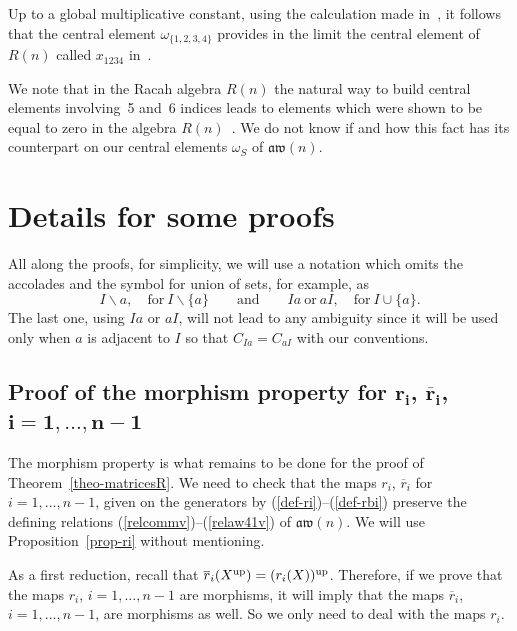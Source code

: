 \documentclass[10pt,a4paper]{amsart}
\numberwithin{equation}{section}
\theoremstyle{definition}
\newcommand{\rb}{\overline{r}}
\newcommand{\aw}{\mathfrak{aw}(n)}
\begin{document}
 Up to a global multiplicative constant, using the calculation made in~\cite{CFR}, it follows that the central element $\omega_{\{1,2,3,4\}}$ provides in the limit the central element of $R(n)$ called $x_{1234}$ in~\cite{CFR, CGPV}.

 We note that in the Racah algebra $R(n)$ the natural way to build central elements involving~5 and~6 indices leads to elements which were shown to be equal to zero in the algebra $R(n)$~\cite{CGPV}. We do not know if and how this fact has its counterpart on our central elements $\omega_S$ of $\aw$.

\appendix

\section{Details for some proofs}\label{sec-appendix}

All along the proofs, for simplicity, we will use a notation which omits the accolades and the symbol for union of sets, for example, as
\[I\backslash a, \quad \text{for}\ I\backslash\{a\}\qquad \text{and}\qquad Ia\ \text{or}\ aI, \quad \text{for}\ I\cup\{a\} .\]
The last one, using $Ia$ or $aI$, will not lead to any ambiguity since it will be used only when $a$ is adjacent to $I$ so that $C_{Ia}=C_{aI}$ with our conventions.

\subsection[Proof of the morphism property for r\_i, bar r\_i, i=1,...,n-1]{Proof of the morphism property for $\boldsymbol{r_i}$, $\boldsymbol{\rb_i}$, $\boldsymbol{i=1,\ldots,n-1}$}
The morphism property is what remains to be done for the proof of Theorem~\ref{theo-matricesR}. We need to check that the maps $r_i$, $\rb_i$ for $i=1,\dots,n-1$, given on the generators by (\ref{def-ri})--(\ref{def-rbi}) preserve the defining relations (\ref{relcommv})--(\ref{relaw41v}) of $\aw$. We will use Proposition~\ref{prop-ri} without mentioning.

As a first reduction, recall that $\rb_i(X^{\rm up})=(r_i(X))^{\rm up}$. Therefore, if we prove that the maps $r_i$, $i=1,\dots,n-1$ are morphisms, it will imply that the maps $\rb_i$, $i=1,\dots,n-1$, are morphisms as well. So we only need to deal with the maps $r_i$.
\end{document}
